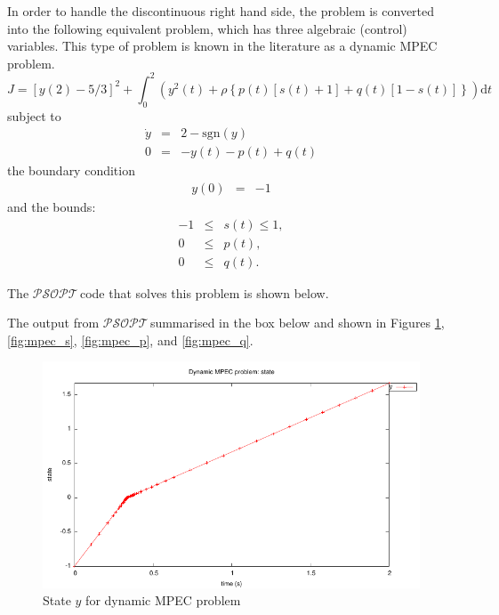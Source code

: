 \documentclass[a4paper,11pt]{report}    %
\newcommand{\psopt}{$\mathcal{PSOPT}$\,}  %
\newenvironment{shadedframe}{%
  \def\FrameCommand{\fcolorbox{black}{shadecolor}}%
  \MakeFramed {\FrameRestore}}
{\endMakeFramed}
\begin{document}
In order to handle the discontinuous right hand side,  the problem is converted into the following equivalent
problem, which has three algebraic (control) variables. This type of problem is known in the literature as a dynamic MPEC problem.
\begin{equation}
  J = \left[ y(2)- 5/3\right]^2 + \int_0^2 \left( y^2(t) + \rho\left\{ p(t)[s(t)+1] +q(t)[1-s(t)] \right\} \right) \mathrm{d}t
\end{equation}
subject to 
\begin{equation}
  \begin{array}{lcl}
    \dot y & = & 2 - \mathrm{sgn}(y) \\
     0 &=& -y(t) -p(t) + q(t)
  \end{array}
\end{equation}
the boundary condition
\begin{equation}
  \begin{array}{lcl}
    y(0) & = & -1 
  \end{array}
\end{equation}
and the bounds:
\begin{equation}
  \begin{array}{lcl}
    -1 &\le & s(t) \le  1, \\
     0 &\le & p(t), \\
     0 &\le & q(t).      
  \end{array}
\end{equation}

The \psopt code that solves this problem is shown below.  

\tiny
\begin{shadedframe}

\end{shadedframe}
\normalsize

The output from \psopt summarised in the box below and shown in Figures \ref{fig:mpec_state}, \ref{fig:mpec_s}, \ref{fig:mpec_p}, and \ref{fig:mpec_q}.

\begin{shadedframe}

\end{shadedframe}

\begin{figure}
  \centering 
  \includegraphics{../examples/mpec/y}
  \caption{State $y$ for dynamic MPEC problem}
 \label{fig:mpec_state}
\end{figure}
\end{document}
